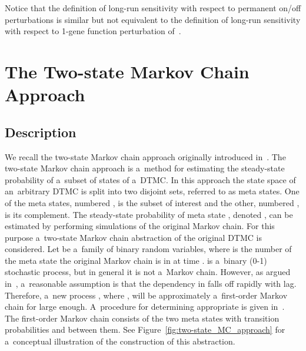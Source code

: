\documentclass[runningheads,a4paper]{llncs}
\begin{document}
Notice that the definition of long-run sensitivity with respect to permanent on/off perturbations
is similar but not equivalent to the definition of long-run sensitivity with respect to 1-gene
function perturbation of~\cite{SDKZ02}.


\section{The Two-state Markov Chain Approach}
\label{sec:twostate}


\subsection{Description}
We recall the two-state Markov chain approach originally introduced in~\cite{RL92}. The two-state
Markov chain approach is a~method for estimating the steady-state probability of a~subset of
states of a~DTMC. In this approach the state space of an~arbitrary DTMC is split into two disjoint
sets, referred to as meta states. One of the meta states, numbered , is the subset of interest
and the other, numbered , is its complement. The steady-state probability of meta state ,
denoted , can be estimated by performing simulations of the original Markov chain. For this
purpose a~two-state Markov chain abstraction of the original DTMC is considered. Let
 be a~family of binary random variables, where  is the number of the
meta state the original Markov chain is in at time .  is a~binary (0-1)
stochastic process, but in general it is not a~Markov chain. However, as argued in~\cite{RL92},
a~reasonable assumption is that the dependency in  falls off rapidly with
lag. Therefore, a~new process , where , will
be approximately a~first-order Markov chain for  large enough. A~procedure for determining
appropriate  is given in~\cite{RL92}. The first-order Markov chain consists of the two meta
states with transition probabilities  and  between them. See
Figure~\ref{fig:two-state_MC_approach} for a~conceptual illustration of the construction of this
abstraction.
\end{document}
